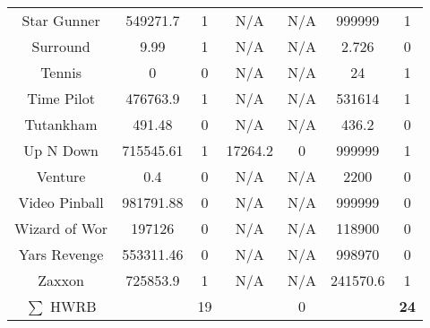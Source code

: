\begin{table}[!hb]
\begin{center}
\begin{tabular}{c cc cc cc}
        Star Gunner & 549271.7 & 1  & N/A & N/A & 999999 & 1  \\  
        Surround & 9.99 & 1  & N/A & N/A & 2.726 & 0  \\  
        Tennis & 0 & 0  & N/A & N/A & 24 & 1  \\  
        Time Pilot & 476763.9 & 1  & N/A & N/A & 531614 & 1  \\  
        Tutankham & 491.48 & 0  & N/A & N/A & 436.2 & 0  \\  
        Up N Down & 715545.61 & 1  & 17264.2 & 0  & 999999 & 1  \\  
        Venture & 0.4 & 0  & N/A & N/A & 2200 & 0  \\  
        Video Pinball & 981791.88 & 0  & N/A & N/A & 999999 & 0  \\  
        Wizard of Wor & 197126 & 0  & N/A & N/A & 118900 & 0  \\  
        Yars Revenge & 553311.46 & 0  & N/A & N/A & 998970 & 0  \\  
        Zaxxon & 725853.9 & 1  & N/A & N/A & 241570.6 & 1 \\ 
        \midrule
         $\sum$ HWRB & & 19 & & 0 & & \textbf{24} \\
         \bottomrule
\end{tabular}
\end{center}
\end{table}


